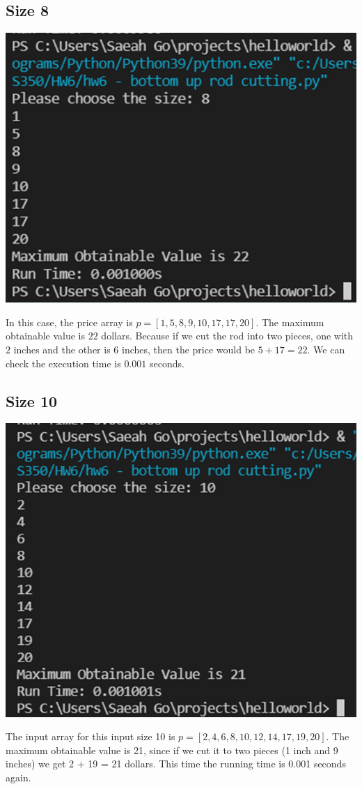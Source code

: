 \documentclass{article}
\begin{document}
\subsection{\textbf{Size 8}}
\begin{center}
\includegraphics[scale = 0.6]{size 8.png} \\
\end{center}
In this case, the price array is $p = [1, 5, 8, 9, 10, 17, 17, 20]$. The maximum obtainable value is $22$ dollars. Because if we cut the rod into two pieces, one with $2$ inches and the other is $6$ inches, then the price would be $5 + 17 = 22$. We can check the execution time is $0.001$ seconds.

\subsection{\textbf{Size 10}}
\begin{center}
\includegraphics[scale = 0.5]{size 10.png} \\
\end{center}
The input array for this input size 10 is $p = [2, 4, 6, 8, 10, 12, 14, 17, 19, 20]$. The maximum obtainable value is 21, since if we cut it to two pieces (1 inch and 9 inches) we get 2 + 19 = 21 dollars. This time the running time is 0.001 seconds again.
\end{document}
